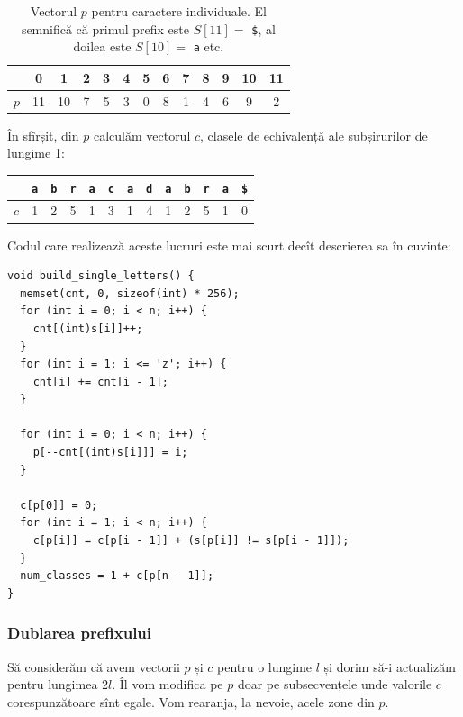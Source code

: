 \documentclass[../main.tex]{subfiles}
\begin{document}
\begin{table}[H]
  \centering
  \begin{tabular}{c|cccccccccccc}
    & 0 & 1 & 2 & 3 & 4 & 5 & 6 & 7 & 8 & 9 & 10 & 11 \\
    \hline
    $p$ & 11 & 10 & 7 & 5 & 3 & 0 & 8 & 1 & 4 & 6 & 9 & 2 \\
  \end{tabular}
  \caption{Vectorul $p$ pentru caractere individuale. El semnifică că primul prefix este $S[11] = $ \texttt{\$}, al doilea este $S[10] =$ \texttt{a} etc.}
\end{table}

În sfîrșit, din $p$ calculăm vectorul $c$, clasele de echivalență ale subșirurilor de lungime 1:

\begin{table}[H]
  \centering
  \begin{tabular}{c|cccccccccccc}
    & \texttt{a} & \texttt{b} & \texttt{r} & \texttt{a} & \texttt{c} & \texttt{a} & \texttt{d} & \texttt{a} & \texttt{b} & \texttt{r} & \texttt{a} & \texttt{\$} \\
    \hline
    $c$ & 1 & 2 & 5 & 1 & 3 & 1 & 4 & 1 & 2 & 5 & 1 & 0 \\
  \end{tabular}
\end{table}

Codul care realizează aceste lucruri este mai scurt decît descrierea sa în cuvinte:

\begin{verbatim}
void build_single_letters() {
  memset(cnt, 0, sizeof(int) * 256);
  for (int i = 0; i < n; i++) {
    cnt[(int)s[i]]++;
  }
  for (int i = 1; i <= 'z'; i++) {
    cnt[i] += cnt[i - 1];
  }

  for (int i = 0; i < n; i++) {
    p[--cnt[(int)s[i]]] = i;
  }

  c[p[0]] = 0;
  for (int i = 1; i < n; i++) {
    c[p[i]] = c[p[i - 1]] + (s[p[i]] != s[p[i - 1]]);
  }
  num_classes = 1 + c[p[n - 1]];
}
\end{verbatim}

\subsubsection*{Dublarea prefixului}

Să considerăm că avem vectorii $p$ și $c$ pentru o lungime $l$ și dorim să-i actualizăm pentru lungimea $2l$. Îl vom modifica pe $p$ doar pe subsecvențele unde valorile $c$ corespunzătoare sînt egale. Vom rearanja, la nevoie, acele zone din $p$.
\end{document}
